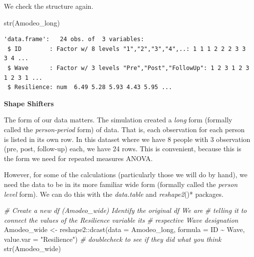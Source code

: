 \documentclass[
  11pt,
]{book}
\newenvironment{Shaded}{\begin{snugshade}}{\end{snugshade}}
\newcommand{\AttributeTok}[1]{\textcolor[rgb]{0.77,0.63,0.00}{#1}}
\newcommand{\CommentTok}[1]{\textcolor[rgb]{0.56,0.35,0.01}{\textit{#1}}}
\newcommand{\FunctionTok}[1]{\textcolor[rgb]{0.00,0.00,0.00}{#1}}
\newcommand{\NormalTok}[1]{#1}
\newcommand{\OtherTok}[1]{\textcolor[rgb]{0.56,0.35,0.01}{#1}}
\newcommand{\SpecialCharTok}[1]{\textcolor[rgb]{0.00,0.00,0.00}{#1}}
\newcommand{\StringTok}[1]{\textcolor[rgb]{0.31,0.60,0.02}{#1}}
\begin{document}
\begin{Shaded}
\end{Shaded}

We check the structure again.

\begin{Shaded}
\begin{Highlighting}[]
\FunctionTok{str}\NormalTok{(Amodeo\_long)}
\end{Highlighting}
\end{Shaded}

\begin{verbatim}
'data.frame':   24 obs. of  3 variables:
 $ ID        : Factor w/ 8 levels "1","2","3","4",..: 1 1 1 2 2 2 3 3 3 4 ...
 $ Wave      : Factor w/ 3 levels "Pre","Post","FollowUp": 1 2 3 1 2 3 1 2 3 1 ...
 $ Resilience: num  6.49 5.28 5.93 4.43 5.95 ...
\end{verbatim}

\textbf{Shape Shifters}

The form of our data matters. The simulation created a \emph{long} form (formally called the \emph{person-period} form) of data. That is, each observation for each person is listed in its own row. In this dataset where we have 8 people with 3 observation (pre, post, follow-up) each, we have 24 rows. This is convenient, because this is the form we need for repeated measures ANOVA.

However, for some of the calculations (particularly those we will do by hand), we need the data to be in its more familiar wide form (formally called the \emph{person level} form). We can do this with the \emph{data.table} and \emph{reshape2}()* packages.

\begin{Shaded}
\begin{Highlighting}[]
\CommentTok{\# Create a new df (Amodeo\_wide) Identify the original df We are}
\CommentTok{\# telling it to connect the values of the Resilience variable its}
\CommentTok{\# respective Wave designation}
\NormalTok{Amodeo\_wide }\OtherTok{\textless{}{-}}\NormalTok{ reshape2}\SpecialCharTok{::}\FunctionTok{dcast}\NormalTok{(}\AttributeTok{data =}\NormalTok{ Amodeo\_long, }\AttributeTok{formula =}\NormalTok{ ID }\SpecialCharTok{\textasciitilde{}}\NormalTok{ Wave,}
    \AttributeTok{value.var =} \StringTok{"Resilience"}\NormalTok{)}
\CommentTok{\# doublecheck to see if they did what you think}
\FunctionTok{str}\NormalTok{(Amodeo\_wide)}
\end{Highlighting}
\end{Shaded}
\end{document}
